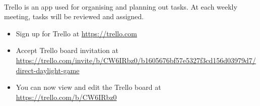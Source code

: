\documentclass[11pt]{article}
\begin{document}
\paragraph{}
Trello is an app used for organising and planning out tasks. At each weekly meeting, tasks will be reviewed and assigned.
\begin{itemize}
\item Sign up for Trello at \url{https://trello.com}
\item Accept Trello board invitation at \\ \url{https://trello.com/invite/b/CW6IRbz0/b1605676bf57e5327f3cd156d03979d7/direct-daylight-game}
\item You can now view and edit the Trello board at \url{https://trello.com/b/CW6IRbz0}
\end{itemize}
\end{document}
